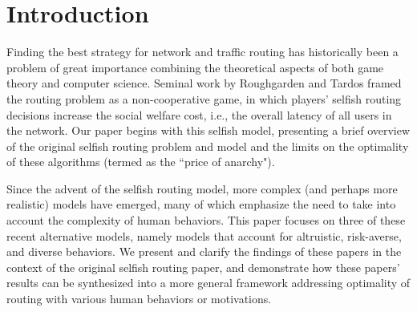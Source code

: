\section{Introduction}
Finding the best strategy for network and traffic routing has historically been a problem of great importance combining the theoretical aspects of both game theory and computer science. 
Seminal work by Roughgarden and Tardos framed the routing problem as a non-cooperative game,
in which players' selfish routing decisions increase the social welfare cost, i.e., the overall latency of all users in the network.
Our paper begins with this selfish model, presenting a brief overview of the original selfish routing problem and model and the limits on the optimality of these algorithms (termed as the ``price of anarchy"). 

Since the advent of the selfish routing model, more complex (and perhaps more realistic) models have emerged, many of which emphasize the need to take into account the complexity of human behaviors.
This paper focuses on three of these recent alternative models, namely models that account for altruistic, risk-averse, and diverse behaviors. We present and clarify the findings of these papers in the context of the original selfish routing paper, and demonstrate how these papers' results can be synthesized into a more general framework addressing optimality of routing with various human behaviors or motivations.

